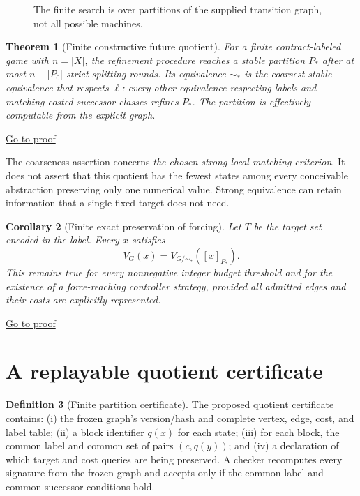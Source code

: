 \documentclass[11pt,letterpaper]{article}
\newtheorem{theorem}{Theorem}[section]
\newtheorem{corollary}[theorem]{Corollary}
\theoremstyle{definition}
\newtheorem{definition}[theorem]{Definition}
\theoremstyle{remark}
\newcommand{\backproof}[1]{\hfill\hyperlink{proof:#1}{\footnotesize Go to proof}}
\begin{document}
\begin{figure}[ht]
\centering{}
\caption{The finite search is over partitions of the supplied transition graph, not all possible machines.}
\end{figure}

\begin{theorem}[Finite constructive future quotient]\label{thm:refine}\hypertarget{stmt:refine}{}
For a finite contract-labeled game with $n=|X|$, the refinement procedure reaches a stable partition $P_*$ after at most $n-|P_0|$ strict splitting rounds. Its equivalence $\sim_*$ is the coarsest stable equivalence that respects $\ell$: every other equivalence respecting labels and matching costed successor classes refines $P_*$. The partition is effectively computable from the explicit graph.
\end{theorem}\backproof{refine}

The coarseness assertion concerns \emph{the chosen strong local matching criterion}. It does not assert that this quotient has the fewest states among every conceivable abstraction preserving only one numerical value. Strong equivalence can retain information that a single fixed target does not need.

\begin{corollary}[Finite exact preservation of forcing]\label{cor:val}\hypertarget{stmt:val}{}
Let $T$ be the target set encoded in the label. Every $x$ satisfies
\[
 V_G(x)=V_{G/\sim_*}([x]_{P_*}).
\]
This remains true for every nonnegative integer budget threshold and for the existence of a force-reaching controller strategy, provided all admitted edges and their costs are explicitly represented.
\end{corollary}\backproof{val}

\section{A replayable quotient certificate}
\begin{definition}[Finite partition certificate]
The proposed quotient certificate contains: (i) the frozen graph's version/hash and complete vertex, edge, cost, and label table; (ii) a block identifier $q(x)$ for each state; (iii) for each block, the common label and common set of pairs $(c,q(y))$; and (iv) a declaration of which target and cost queries are being preserved. A checker recomputes every signature from the frozen graph and accepts only if the common-label and common-successor conditions hold.
\end{definition}
\end{document}
